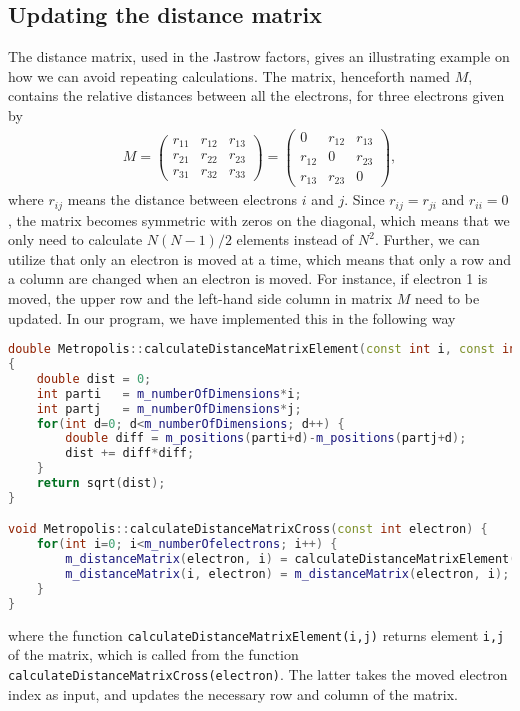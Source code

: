\subsection{Updating the distance matrix} \label{sec:distancematrix}
The distance matrix, used in the Jastrow factors, gives an illustrating example on how we can avoid repeating calculations. The matrix, henceforth named $M$, contains the relative distances between all the electrons, for three electrons given by
\begin{eqnarray}
M=
\begin{pmatrix}
r_{11} & r_{12} & r_{13} \\
r_{21} & r_{22} & r_{23} \\
r_{31} & r_{32} & r_{33}
\end{pmatrix}
=
\begin{pmatrix}
0 & r_{12} & r_{13} \\
r_{12} & 0 & r_{23} \\
r_{13} & r_{23} & 0
\end{pmatrix},
\end{eqnarray}
where $r_{ij}$ means the distance between electrons $i$ and $j$. Since $r_{ij}=r_{ji}$ and $r_{ii}=0$, the matrix becomes symmetric with zeros on the diagonal, which means that we only need to calculate $N(N-1)/2$ elements instead of $N^2$. Further, we can utilize that only an electron is moved at a time, which means that only a row and a column are changed when an electron is moved. For instance, if electron 1 is moved, the upper row and the left-hand side column in matrix $M$ need to be updated. In our program, we have implemented this in the following way
\lstset{basicstyle=\scriptsize}
\begin{lstlisting}[language=c++]
double Metropolis::calculateDistanceMatrixElement(const int i, const int j) 
{
	double dist = 0;
	int parti   = m_numberOfDimensions*i;
	int partj   = m_numberOfDimensions*j;
	for(int d=0; d<m_numberOfDimensions; d++) {
		double diff = m_positions(parti+d)-m_positions(partj+d);
		dist += diff*diff;
	}
	return sqrt(dist);
}

void Metropolis::calculateDistanceMatrixCross(const int electron) {
	for(int i=0; i<m_numberOfelectrons; i++) {
		m_distanceMatrix(electron, i) = calculateDistanceMatrixElement(electron, i);
		m_distanceMatrix(i, electron) = m_distanceMatrix(electron, i);
	}
}
\end{lstlisting}
where the function \lstinline{calculateDistanceMatrixElement(i,j)} returns element \lstinline{i,j} of the matrix, which is called from the function \lstinline{calculateDistanceMatrixCross(electron)}. The latter takes the moved electron index as input, and updates the necessary row and column of the matrix. 

